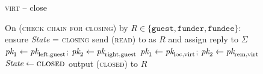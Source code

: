 \begin{figure}[H]
\begin{processbox}{\textsc{virt} -- close}
\begin{algorithmic}[1]
      \State On (\textsc{check chain for closing}) by $R \in \{\texttt{guest},
      \texttt{funder}, \texttt{fundee}\}$:
      \Indent
        \State ensure \textit{State} = \textsc{closing}
        \State send (\textsc{read}) to \ledger as $R$ and assign reply to
        $\Sigma$
          \State $\textit{pk}_{1} \gets \textit{pk}_{\mathrm{left}, \mathrm{guest}}$; $\textit{pk}_{2}
          \gets \textit{pk}_{\mathrm{right}, \mathrm{guest}}$
        \Else \: 
          \State $\textit{pk}_{1} \gets \textit{pk}_{\mathrm{loc}, \mathrm{virt}}$; $\textit{pk}_{2} \gets
          \textit{pk}_{\mathrm{rem}, \mathrm{virt}}$
        \EndIf
         
          \State $\textit{State} \gets \textsc{closed}$
          \State output (\textsc{closed}) to $R$
        \EndIf
      \EndIndent
    \end{algorithmic}
  \end{processbox}
  \caption{}
  \label{code:virtual-layer:close}
\end{figure}
